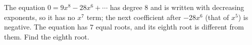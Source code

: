 The equation $0=9x^8-28x^6+\cdots$ has degree $8$ and is written with decreasing exponents, so it has no $x^7$ term; the next coefficient after $-28x^6$ (that of $x^5$) is negative. The equation has $7$ equal roots, and its eighth root is different from them. Find the eighth root.
